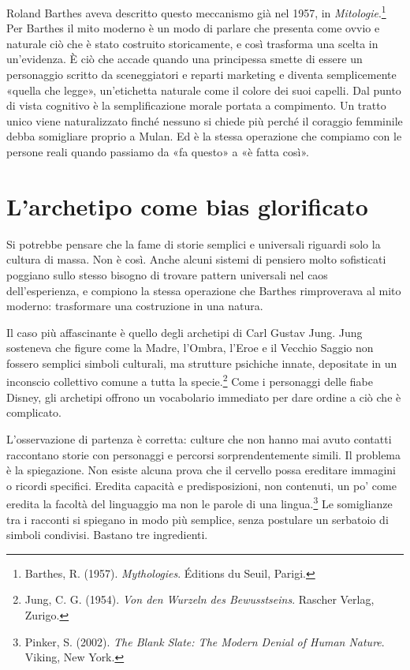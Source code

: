 Roland Barthes aveva descritto questo meccanismo già nel 1957, in \textit{Mitologie}.\footnote{Barthes, R. (1957). \textit{Mythologies}. \'{E}ditions du Seuil, Parigi.} Per Barthes il mito moderno è un modo di parlare che presenta come ovvio e naturale ciò che è stato costruito storicamente, e così trasforma una scelta in un'evidenza. È ciò che accade quando una principessa smette di essere un personaggio scritto da sceneggiatori e reparti marketing e diventa semplicemente «quella che legge», un'etichetta naturale come il colore dei suoi capelli. Dal punto di vista cognitivo è la semplificazione morale portata a compimento. Un tratto unico viene naturalizzato finché nessuno si chiede più perché il coraggio femminile debba somigliare proprio a Mulan. Ed è la stessa operazione che compiamo con le persone reali quando passiamo da «fa questo» a «è fatta così».

\section{L'archetipo come bias glorificato}
\label{sec:p2c24-jung}

Si potrebbe pensare che la fame di storie semplici e universali riguardi solo la cultura di massa. Non è così. Anche alcuni sistemi di pensiero molto sofisticati poggiano sullo stesso bisogno di trovare pattern universali nel caos dell'esperienza, e compiono la stessa operazione che Barthes rimproverava al mito moderno: trasformare una costruzione in una natura.

Il caso più affascinante è quello degli archetipi di Carl Gustav Jung. Jung sosteneva che figure come la Madre, l'Ombra, l'Eroe e il Vecchio Saggio non fossero semplici simboli culturali, ma strutture psichiche innate, depositate in un inconscio collettivo comune a tutta la specie.\footnote{Jung, C. G. (1954). \textit{Von den Wurzeln des Bewusstseins}. Rascher Verlag, Zurigo.} Come i personaggi delle fiabe Disney, gli archetipi offrono un vocabolario immediato per dare ordine a ciò che è complicato.

L'osservazione di partenza è corretta: culture che non hanno mai avuto contatti raccontano storie con personaggi e percorsi sorprendentemente simili. Il problema è la spiegazione. Non esiste alcuna prova che il cervello possa ereditare immagini o ricordi specifici. Eredita capacità e predisposizioni, non contenuti, un po' come eredita la facoltà del linguaggio ma non le parole di una lingua.\footnote{Pinker, S. (2002). \textit{The Blank Slate: The Modern Denial of Human Nature}. Viking, New York.} Le somiglianze tra i racconti si spiegano in modo più semplice, senza postulare un serbatoio di simboli condivisi. Bastano tre ingredienti.

